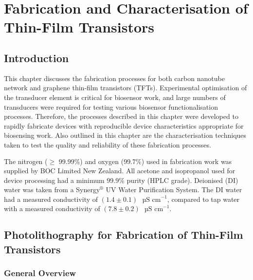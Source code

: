\documentclass[
  a4paper,
]{scrbook}
\begin{document}

\hypertarget{sec-fabrication}{%
\chapter{Fabrication and Characterisation of Thin-Film
Transistors}\label{sec-fabrication}}

\hypertarget{introduction-2}{%
\section{Introduction}\label{introduction-2}}

This chapter discusses the fabrication processes for both carbon
nanotube network and graphene thin-film transistors (TFTs). Experimental
optimisation of the transducer element is critical for biosensor work,
and large numbers of transducers were required for testing various
biosensor functionalisation processes. Therefore, the processes
described in this chapter were developed to rapidly fabricate devices
with reproducible device characteristics appropriate for biosensing
work. Also outlined in this chapter are the characterisation techniques
taken to test the quality and reliability of these fabrication
processes.

The nitrogen (\(\geq\) 99.99\%) and oxygen (99.7\%) used in fabrication
work was supplied by BOC Limited New Zealand. All acetone and
isopropanol used for device processing had a minimum 99.9\% purity (HPLC
grade). Deionised (DI) water was taken from a Synergy\(^\circledR\) UV
Water Purification System. The DI water had a measured conductivity of
\((1.4 \pm 0.1)\textrm{ } \textrm{µS cm}^{-1}\), compared to tap water
with a measured conductivity of
\((7.8 \pm 0.2)\textrm{ } \textrm{µS cm}^{-1}\).

\hypertarget{sec-photolithography}{%
\section{Photolithography for Fabrication of Thin-Film
Transistors}\label{sec-photolithography}}

\hypertarget{general-overview}{%
\subsection{General Overview}\label{general-overview}}
\end{document}
